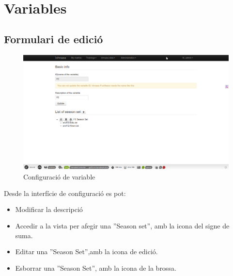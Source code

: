 \section{Variables}
\subsection{Formulari de edici\'{o}}
\begin{figure}[h!]
  \centering
  \includegraphics[scale=0.2]{img/userguide/variable_configuration.png}
  \caption{Configuraci\'{o} de variable}
  \label{fig:placement}
\end{figure}
Desde la interf\'{i}cie de configuraci\'{o} es pot:
\begin{itemize}
\item Modificar la descripci\'{o}
\item Accedir a la vista per afegir una ''Season set'', amb la icona del signe de suma.
\item Editar una ''Season Set'',amb la icona de edici\'{o}.
\item Esborrar una ''Season Set'', amb la icona de la brossa.
\end{itemize}

